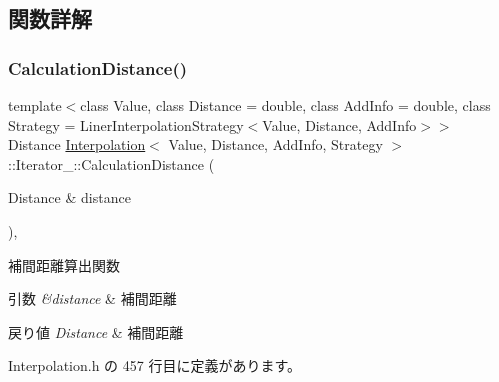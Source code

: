 \subsection{関数詳解}
\mbox{\label{class_interpolation_1_1_iterator___a74cc0e2ed214dbda534e7d69aab89394}} 
\subsubsection{\texorpdfstring{Calculation\+Distance()}{CalculationDistance()}}
{\footnotesize\ttfamily template$<$class Value, class Distance = double, class Add\+Info = double, class Strategy = Liner\+Interpolation\+Strategy$<$\+Value, Distance, Add\+Info$>$$>$ \\
Distance \mbox{\hyperlink{class_interpolation}{Interpolation}}$<$ Value, Distance, Add\+Info, Strategy $>$\+::Iterator\+\_\+\+::\+Calculation\+Distance (\begin{DoxyParamCaption}\item[{Distance \&}]{distance }\end{DoxyParamCaption})\hspace{0.3cm}{\ttfamily [inline]}, {\ttfamily [private]}}



補間距離算出関数 


\begin{DoxyParams}{引数}
{\em \&distance} & 補間距離 \\
\hline
\end{DoxyParams}

\begin{DoxyRetVals}{戻り値}
{\em Distance} & 補間距離 \\
\hline
\end{DoxyRetVals}


 Interpolation.\+h の 457 行目に定義があります。

\mbox{\label{class_interpolation_1_1_iterator___a0930994b23a1ef6107ed6ce651b3e344}} 

